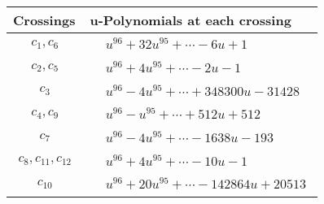 \documentclass[1p]{elsarticle_modified}
\theoremstyle{definition}
\begin{document}
\begin{tabular}{m{50pt}|m{274pt}}
Crossings & \hspace{64pt}u-Polynomials at each crossing \\
\hline $$\begin{aligned}c_{1},c_{6}\end{aligned}$$&$\begin{aligned}
&u^{96}+32 u^{95}+\cdots-6 u+1
\end{aligned}$\\
\hline $$\begin{aligned}c_{2},c_{5}\end{aligned}$$&$\begin{aligned}
&u^{96}+4 u^{95}+\cdots-2 u-1
\end{aligned}$\\
\hline $$\begin{aligned}c_{3}\end{aligned}$$&$\begin{aligned}
&u^{96}-4 u^{95}+\cdots+348300 u-31428
\end{aligned}$\\
\hline $$\begin{aligned}c_{4},c_{9}\end{aligned}$$&$\begin{aligned}
&u^{96}- u^{95}+\cdots+512 u+512
\end{aligned}$\\
\hline $$\begin{aligned}c_{7}\end{aligned}$$&$\begin{aligned}
&u^{96}-4 u^{95}+\cdots-1638 u-193
\end{aligned}$\\
\hline $$\begin{aligned}c_{8},c_{11},c_{12}\end{aligned}$$&$\begin{aligned}
&u^{96}+4 u^{95}+\cdots-10 u-1
\end{aligned}$\\
\hline $$\begin{aligned}c_{10}\end{aligned}$$&$\begin{aligned}
&u^{96}+20 u^{95}+\cdots-142864 u+20513
\end{aligned}$\\
\hline
\end{tabular}\\~\\
\newpage\renewcommand{\arraystretch}{1}
\end{document}
